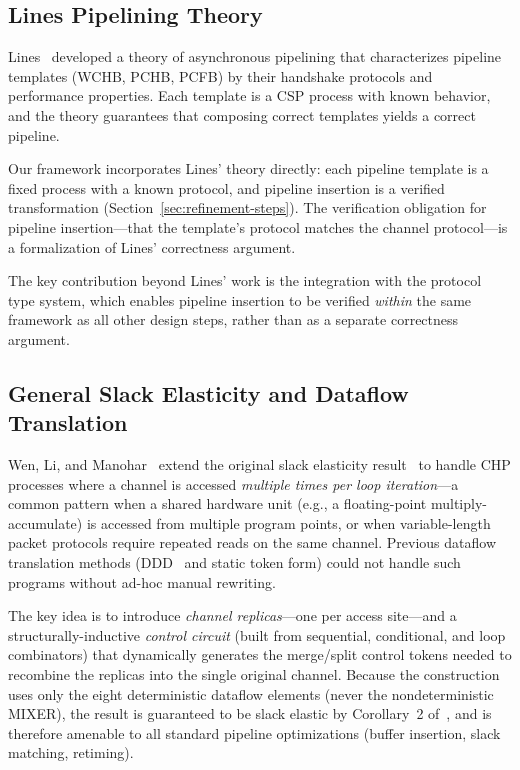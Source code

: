 \documentclass[11pt]{article}
\begin{document}
\subsection{Lines Pipelining Theory}

Lines~\cite{lines1998} developed a theory of asynchronous pipelining
that characterizes pipeline templates (WCHB, PCHB, PCFB) by their
handshake protocols and performance properties.  Each template is a
CSP process with known behavior, and the theory guarantees that
composing correct templates yields a correct pipeline.

Our framework incorporates Lines' theory directly: each pipeline
template is a fixed process with a known protocol, and pipeline
insertion is a verified transformation (Section~\ref{sec:refinement-steps}).
The verification obligation for pipeline insertion---that the template's
protocol matches the channel protocol---is a formalization of Lines'
correctness argument.

The key contribution beyond Lines' work is the integration with the
protocol type system, which enables pipeline insertion to be verified
\emph{within} the same framework as all other design steps, rather
than as a separate correctness argument.

\subsection{General Slack Elasticity and Dataflow Translation}

Wen, Li, and Manohar~\cite{wen2025} extend the original slack
elasticity result~\cite{manohar2001} to handle CHP processes where a
channel is accessed \emph{multiple times per loop iteration}---a
common pattern when a shared hardware unit (e.g., a floating-point
multiply-accumulate) is accessed from multiple program points, or when
variable-length packet protocols require repeated reads on the same
channel.  Previous dataflow translation methods (DDD~\cite{wong2004}
and static token form) could not handle such programs without ad-hoc
manual rewriting.

The key idea is to introduce \emph{channel replicas}---one per access
site---and a structurally-inductive \emph{control circuit} (built from
sequential, conditional, and loop combinators) that dynamically
generates the merge/split control tokens needed to recombine the
replicas into the single original channel.  Because the construction
uses only the eight deterministic dataflow elements (never the
nondeterministic MIXER), the result is guaranteed to be slack elastic
by Corollary~2 of~\cite{manohar2001}, and is therefore amenable to
all standard pipeline optimizations (buffer insertion, slack matching,
retiming).
\end{document}
